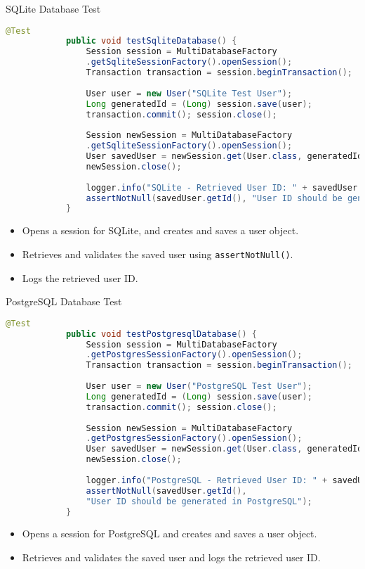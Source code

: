 \documentclass[aspectratio=169, table]{beamer}
\begin{document}
	\begin{frame}[fragile]{SQLite Database Test}
		\vspace{20pt}
		\begin{lstlisting}[language=Java, style=JavaStyle, firstnumber=15]
			@Test
			public void testSqliteDatabase() {
				Session session = MultiDatabaseFactory
				.getSqliteSessionFactory().openSession();
				Transaction transaction = session.beginTransaction();
				
				User user = new User("SQLite Test User");
				Long generatedId = (Long) session.save(user);
				transaction.commit(); session.close();
				
				Session newSession = MultiDatabaseFactory
				.getSqliteSessionFactory().openSession();
				User savedUser = newSession.get(User.class, generatedId);
				newSession.close();
				
				logger.info("SQLite - Retrieved User ID: " + savedUser.getId());
				assertNotNull(savedUser.getId(), "User ID should be generated in SQLite");
			}
		\end{lstlisting}
		
		\begin{itemize}
			\item Opens a session for SQLite, and creates and saves a user object.
			\item Retrieves and validates the saved user using \texttt{assertNotNull()}.
			\item Logs the retrieved user ID.
		\end{itemize}
	\end{frame}
	
	\begin{frame}[fragile]{PostgreSQL Database Test}
		\vspace{20pt}
		\begin{lstlisting}[language=Java, style=JavaStyle, firstnumber=40]
			@Test
			public void testPostgresqlDatabase() {
				Session session = MultiDatabaseFactory
				.getPostgresSessionFactory().openSession();
				Transaction transaction = session.beginTransaction();
				
				User user = new User("PostgreSQL Test User");
				Long generatedId = (Long) session.save(user);
				transaction.commit(); session.close();
				
				Session newSession = MultiDatabaseFactory
				.getPostgresSessionFactory().openSession();
				User savedUser = newSession.get(User.class, generatedId);
				newSession.close();
				
				logger.info("PostgreSQL - Retrieved User ID: " + savedUser.getId());
				assertNotNull(savedUser.getId(), 
				"User ID should be generated in PostgreSQL");
			}
		\end{lstlisting}
		
		\begin{itemize}
			\item Opens a session for PostgreSQL and creates and saves a user object.
			\item Retrieves and validates the saved user and logs the retrieved user ID.
		\end{itemize}
	\end{frame}
	
\end{document}
